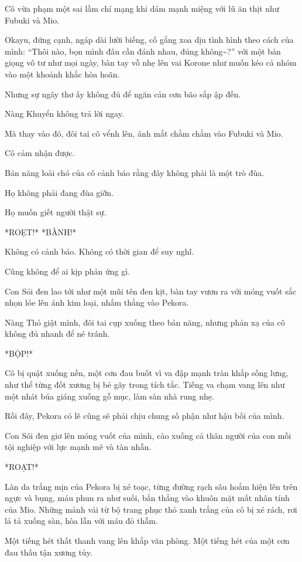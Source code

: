 \documentclass[../main.tex]{subfiles}
\begin{document}
Cô vừa phạm một sai lầm chí mạng khi dám mạnh miệng với lũ ăn thịt như Fubuki và Mio.

Okayu, đứng cạnh, ngáp dài lười biếng, cố gắng xoa dịu tình hình theo cách của mình: ``Thôi nào, bọn mình đâu cần đánh nhau, đúng không\~{}?'' với một bản giọng vô tư như mọi ngày, bàn tay vỗ nhẹ lên vai Korone như muốn kéo cả nhóm vào một khoảnh khắc hòa hoãn.

Nhưng sự ngây thơ ấy không đủ để ngăn cản cơn bão sắp ập đến.

Nàng Khuyển không trả lời ngay.

Mà thay vào đó, đôi tai cô vểnh lên, ánh mắt chằm chằm vào Fubuki và Mio.

Cô cảm nhận được.

Bản năng loài chó của cô cảnh báo rằng đây không phải là một trò đùa.

Họ không phải đang đùa giỡn.

Họ muốn giết người thật sự.

*ROẸT!* *BÀNH!*

Không có cảnh báo. Không có thời gian để suy nghĩ.

Cũng không để ai kịp phản ứng gì.

Con Sói đen lao tới như một mũi tên đen kịt, bàn tay vươn ra với móng vuốt sắc nhọn lóe lên ánh kim loại, nhắm thẳng vào Pekora.

Nàng Thỏ giật mình, đôi tai cụp xuống theo bản năng, nhưng phản xạ của cô không đủ nhanh để né tránh.

*BỘP!*

Cô bị quật xuống nền, một cơn đau buốt vì va đập mạnh tràn khắp sống lưng, như thể từng đốt xương bị bẻ gãy trong tích tắc. Tiếng va chạm vang lên như một nhát búa giáng xuống gỗ mục, làm sàn nhà rung nhẹ.

Rồi đây, Pekora có lẽ cũng sẽ phải chịu chung số phận như hậu bối của mình.

Con Sói đen giơ lên móng vuốt của mình, cào xuống cả thân người của con mồi tội nghiệp với lực mạnh mẽ và tàn nhẫn.

*ROẠT!*

Làn da trắng mịn của Pekora bị xé toạc, từng đường rạch sâu hoắm hiện lên trên ngực và bụng, máu phun ra như suối, bắn thẳng vào khuôn mặt mất nhân tính của Mio. Những mảnh vải từ bộ trang phục thỏ xanh trắng của cô bị xé rách, rơi lả tả xuống sàn, hòa lẫn với máu đỏ thẫm.

Một tiếng hét thất thanh vang lên khắp văn phòng. Một tiếng hét của một cơn đau thấu tận xương tủy.
\end{document}
